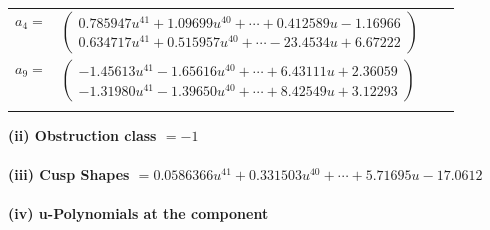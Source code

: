 \documentclass[1p]{elsarticle_modified}
\theoremstyle{definition}
\begin{document}
\begin{tabular}{m{7pt} m{180pt} m{7pt} m{180pt} }
\flushright $a_{4}=$&$\begin{pmatrix}0.785947 u^{41}+1.09699 u^{40}+\cdots+0.412589 u-1.16966\\0.634717 u^{41}+0.515957 u^{40}+\cdots-23.4534 u+6.67222\end{pmatrix}$ \\
\flushright $a_{9}=$&$\begin{pmatrix}-1.45613 u^{41}-1.65616 u^{40}+\cdots+6.43111 u+2.36059\\-1.31980 u^{41}-1.39650 u^{40}+\cdots+8.42549 u+3.12293\end{pmatrix}$\\&\end{tabular}
\flushleft \textbf{(ii) Obstruction class $= -1$}\\~\\
\flushleft \textbf{(iii) Cusp Shapes $= 0.0586366 u^{41}+0.331503 u^{40}+\cdots+5.71695 u-17.0612$}\\~\\
\newpage\renewcommand{\arraystretch}{1}
\flushleft \textbf{(iv) u-Polynomials at the component}\newline \\
\end{document}
